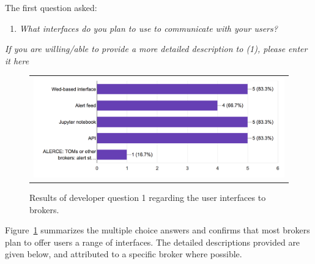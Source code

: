 \documentclass{article}
\begin{document}
The first question asked:
\begin{enumerate}
\item {\em What interfaces do you plan to use to communicate with your users?}
\end{enumerate}
{\em If you are willing/able to provide a more detailed description to (1), please enter it here}

\begin{figure}[ht]
\centering
\begin{tabular}{c}
\includegraphics[width=5in]{figures/developer_question_1.png}
\end{tabular}
\caption{Results of developer question 1 regarding the user interfaces to brokers.}
\label{fig:broker_interfaces}
\end{figure}

Figure~\ref{fig:broker_interfaces} summarizes the multiple choice answers and confirms that most brokers plan to offer users a range of interfaces.  The detailed descriptions provided are given below, and attributed to a specific broker where possible. 
\end{document}
